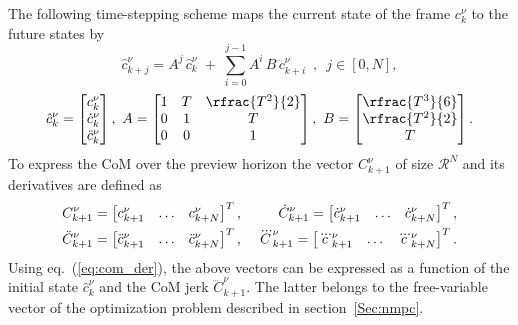 The following time-stepping scheme maps the current state of the frame $c_k^{\nu}$ to the future states by
\begin{equation}
  \label{eq:com_der}
  \hat{c}_{k+j}^{\nu} = A^j \, \hat{c}_{k}^{\nu} \;+\; \sum_{i=0}^{j-1}{A^{i}\,B\,
  \dddot{c}^{\nu}_{k+i}}
  \,\,\, , \,\,\, j \in [0,N] ,
\end{equation}
\vspace*{-0.24cm}
\begin{equation}%
\label{eq:time_scheme}
    \hat{c}_{k}^{\nu} =
    \begin{bmatrix}
        c_{k}^\nu \\
        \dot c_{k}^\nu\\
        \ddot c_{k}^\nu
    \end{bmatrix},\
    A =
    \begin{bmatrix}
        1 & T & \rfrac{T^2}{2} \\
        0 & 1 & T \\
        0 & 0 & 1
    \end{bmatrix},\
    B =
    \begin{bmatrix}
        \rfrac{T^3}{6} \\
        \rfrac{T^2}{2} \\
        T
    \end{bmatrix}.
\end{equation}
To express the CoM over the preview horizon the vector $C_{k+1}^\nu$ of size $\mathcal{R}^N$ and its derivatives are defined as
\begin{align}
  &C_{k+1}^\nu =
  \begin{bmatrix}
    c_{k+1}^\nu &
    \hdots &
    c_{k+N}^\nu \notag
  \end{bmatrix}^T
  ,
\;%
  &\dot{C}_{k+1}^\nu =
  \begin{bmatrix}
    \dot{c}_{k+1}^\nu &
    \hdots &
    \dot{c}_{k+N}^\nu \notag
  \end{bmatrix}^T
  ,
\\
  &\ddot{C}_{k+1}^\nu =
  \begin{bmatrix}
    \ddot{c}_{k+1}^\nu &
    \hdots &
    \ddot{c}_{k+N}^\nu \notag
  \end{bmatrix}^T
  ,
\;%
 &\dddot{C}_{k+1}^\nu =
  \begin{bmatrix}
    \dddot{c}_{k+1}^\nu &
    \hdots &
    \dddot{c}_{k+N}^\nu \notag
  \end{bmatrix}^T
  .
\end{align}
Using eq.~(\ref{eq:com_der}), the above vectors can be expressed as a function of the initial state $\hat{c}_k^\nu$ and the CoM jerk
$
\dddot{C}_{k+1}^\nu
$.
The latter belongs to the free-variable vector of the optimization problem described in section~\ref{Sec:nmpc}.

